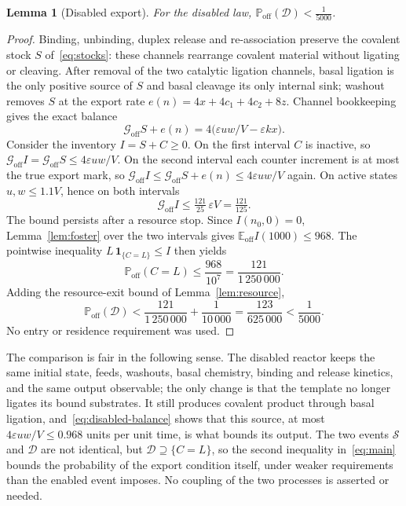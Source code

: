 \documentclass[11pt,a4paper]{article}
\theoremstyle{plain}
\newtheorem{lemma}[theorem]{Lemma}
\theoremstyle{definition}
\theoremstyle{remark}
\newcommand{\E}{\mathbb E}
\newcommand{\Prob}{\mathbb P}
\newcommand{\G}{\mathcal G}
\newcommand{\ind}{\mathbf 1}
\newcommand{\eps}{\varepsilon}
\newcommand{\Son}{\mathcal S}
\newcommand{\Doff}{\mathcal D}
\begin{document}
\begin{lemma}[Disabled export]\label{lem:disabled}
For the disabled law, $\Prob_{\mathrm{off}}(\Doff)<\frac1{5000}$.
\end{lemma}
\begin{proof}
Binding, unbinding, duplex release and re-association preserve the covalent stock $S$ of~\eqref{eq:stocks}: these channels rearrange covalent material without ligating or cleaving. After removal of the two catalytic ligation channels, basal ligation is the only positive source of $S$ and basal cleavage its only internal sink; washout removes $S$ at the export rate $e(n)=4x+4c_1+4c_2+8z$. Channel bookkeeping gives the exact balance
\begin{equation}\label{eq:disabled-balance}
\G_{\mathrm{off}}S+e(n)=4\bigl(\eps uw/V-\eps kx\bigr).
\end{equation}
Consider the inventory $I=S+C\ge0$. On the first interval $C$ is inactive, so $\G_{\mathrm{off}}I=\G_{\mathrm{off}}S\le4\eps uw/V$. On the second interval each counter increment is at most the true export mark, so $\G_{\mathrm{off}}I\le\G_{\mathrm{off}}S+e(n)\le4\eps uw/V$ again. On active states $u,w\le1.1V$, hence on both intervals
\[
\G_{\mathrm{off}}I\le\tfrac{121}{25}\,\eps V=\tfrac{121}{125}.
\]
The bound persists after a resource stop. Since $I(n_0,0)=0$, Lemma~\ref{lem:foster} over the two intervals gives $\E_{\mathrm{off}}I(1000)\le968$. The pointwise inequality $L\,\ind_{\{C=L\}}\le I$ then yields
\[
\Prob_{\mathrm{off}}(C=L)\le\frac{968}{10^7}=\frac{121}{1\,250\,000}.
\]
Adding the resource-exit bound of Lemma~\ref{lem:resource},
\begin{equation}\label{eq:disabled-final}
\Prob_{\mathrm{off}}(\Doff)<\frac{121}{1\,250\,000}+\frac1{10\,000}=\frac{123}{625\,000}<\frac1{5000}.
\end{equation}
No entry or residence requirement was used.
\end{proof}

The comparison is fair in the following sense. The disabled reactor keeps the same initial state, feeds, washouts, basal chemistry, binding and release kinetics, and the same output observable; the only change is that the template no longer ligates its bound substrates. It still produces covalent product through basal ligation, and~\eqref{eq:disabled-balance} shows that this source, at most $4\eps uw/V\le0.968$ units per unit time, is what bounds its output. The two events $\Son$ and $\Doff$ are not identical, but $\Doff\supseteq\{C=L\}$, so the second inequality in~\eqref{eq:main} bounds the probability of the export condition itself, under weaker requirements than the enabled event imposes. No coupling of the two processes is asserted or needed.
\end{document}
